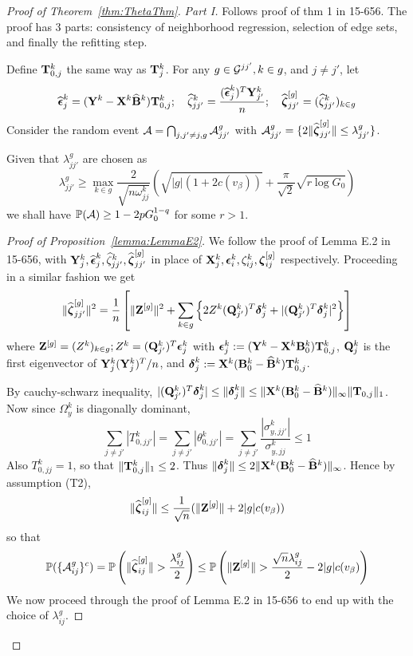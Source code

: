 \documentclass[fleqn,11pt]{article}
\numberwithin{equation}{section}
\begin{document}
\begin{proof}[Proof of Theorem~\ref{thm:ThetaThm}]


\textit{Part I.} Follows proof of thm 1 in 15-656. The proof has 3 parts: consistency of neighborhood regression, selection of edge sets, and finally the refitting step.

Define ${\mathbf{T}}_{0,j}^k$ the same way as ${\mathbf{T}}_j^k$. For any $g \in {\cal{G}}^{jj'}, k \in g$, and $j \neq j'$, let
%
$$
\widehat {{\boldsymbol{\epsilon}}}_j^k = ({\mathbf{Y}}^k - {\mathbf{X}}^k \widehat {{\mathbf{B}}}^k ) {\mathbf{T}}_{0,j}^k; \quad
\widehat \zeta_{jj'}^k = \frac{(\widehat {{\boldsymbol{\epsilon}}}_j^k)^T {\mathbf{Y}}_{j'}^k}{n}; \quad
\widehat {{\boldsymbol{\zeta}}}_{jj'}^{[g]} = (\widehat \zeta_{jj'}^k)_{k \in g}
$$
%
Consider the random event ${\cal{A}} = \bigcap_{j, j'\neq j, g} {\cal{A}}_{jj'}^g$ with ${\cal{A}}_{jj'}^g = \{ 2 \| \widehat {{\boldsymbol{\zeta}}}_{jj'}^{[g]} \| \leq \lambda_{jj'}^g \}$.

\begin{Proposition}\label{lemma:LemmaE2}
Given that $\lambda_{jj'}^g$ are chosen as
%
$$
\lambda_{jj'}^g \geq \max_{k \in g} \frac{2}{\sqrt{n \omega_{jj}^k}} \left( \sqrt{|g| (1 + 2 c(v_\beta)) } + \frac{\pi}{\sqrt 2} \sqrt {r \log G_0} \right)
$$
%
we shall have $ {\mathbb{P}} ({\cal{A}}) \geq 1 - 2p G_0^{1-q} $ for some $r>1$.
\end{Proposition}

\begin{proof}[Proof of Proposition~\ref{lemma:LemmaE2}]
We follow the proof of Lemma E.2 in 15-656, with ${\mathbf{Y}}_j^k, \widehat {{\boldsymbol{\epsilon}}}_j^k, \widehat \zeta_{jj'}^k, \widehat {{\boldsymbol{\zeta}}}_{jj'}^{[g]}$ in place of ${\mathbf{X}}_j^k, {\boldsymbol{\epsilon}}_i^k, \zeta_{ij}^k, {\boldsymbol{\zeta}}_{ij}^{[g]}$ respectively. Proceeding in a similar fashion we get
%
$$
\| \widehat {{\boldsymbol{\zeta}}}_{jj'}^{[g]} \|^2 = \frac{1}{n} \left[ \| {\mathbf{Z}}^{[g]} \|^2 + \sum_{k \in g} \left\{ 2 Z^k ({\mathbf{Q}}_{j'}^k)^T {\boldsymbol{\delta}}_j^k + | ({\mathbf{Q}}_{j'}^k)^T {\boldsymbol{\delta}}_j^k |^2 \right\} \right]
$$
%
where ${\mathbf{Z}}^{[g]} = (Z^k)_{k \in g}; Z^k = ({\mathbf{Q}}_{j'}^k)^T {\boldsymbol{\epsilon}}_j^k$ with ${\boldsymbol{\epsilon}}_j^k :=({\mathbf{Y}}^k - {\mathbf{X}}^k {\mathbf{B}}_0^k ) {\mathbf{T}}_{0,j}^k$, ${\mathbf{Q}}_j^k$ is the first eigenvector of ${\mathbf{Y}}_j^k ({\mathbf{Y}}_j^k)^T/n$, and ${\boldsymbol{\delta}}_j^k := {\mathbf{X}}^k ({\mathbf{B}}_0^k - \widehat {{\mathbf{B}}}^k) {\mathbf{T}}_{0,j}^k$.

By cauchy-schwarz inequality, $| ({\mathbf{Q}}_{j'}^k)^T {\boldsymbol{\delta}}_j^k | \leq \| {\boldsymbol{\delta}}_j^k \| \leq \| {\mathbf{X}}^k ({\mathbf{B}}_0^k - \widehat {{\mathbf{B}}}^k) \|_\infty \| {\mathbf{T}}_{0,j} \|_1$. Now since $\Omega_y^k$ is diagonally dominant,
%
$$
\sum_{j \neq j'} |T_{0,jj'}^k| =  \sum_{j \neq j'} |\theta_{0,jj'}^k| = \sum_{j \neq j'} \frac{|\sigma_{y,jj'}^k|}{ \sigma_{y,jj}^k} \leq 1
$$
%
Also $T_{0,jj}^k = 1$, so that $\| {\mathbf{T}}_{0,j}^k \|_1 \leq 2$. Thus $\| {\boldsymbol{\delta}}_j^k \| \leq 2 \| {\mathbf{X}}^k ({\mathbf{B}}_0^k - \widehat {{\mathbf{B}}}^k) \|_\infty$. Hence by assumption (T2),
%
$$
\| \widehat {{\boldsymbol{\zeta}}}_{ij}^{[g]} \| \leq \frac{1}{\sqrt n} ( \| {\mathbf{Z}}^{[g]} \| + 2 |g| c(v_\beta))
$$
%
so that
$$
{\mathbb{P}} ( \{ {\cal{A}}_{ij}^g \}^c ) = {\mathbb{P}} \left( \| \widehat {{\boldsymbol{\zeta}}}_{ij}^{[g]} \| > \frac{\lambda_{ij}^g}{2} \right) \leq {\mathbb{P}} \left( \| {\mathbf{Z}}^{[g]} \|  > \frac{\sqrt n \lambda_{ij}^g}{2} - 2 |g| c(v_\beta)  \right)
$$
We now proceed through the proof of Lemma E.2 in 15-656 to end up with the choice of $\lambda_{ij}^g$.
\end{proof}
%


\end{proof}
\end{document}
